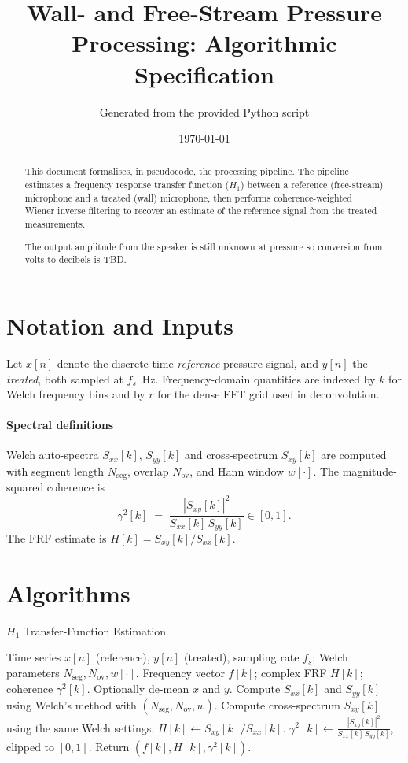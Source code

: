 \documentclass[a4paper,11pt]{article}
\title{Wall- and Free-Stream Pressure Processing: Algorithmic Specification}
\author{Generated from the provided Python script}
\date{\today}
\begin{document}
\maketitle

\begin{abstract}
This document formalises, in pseudocode, the processing pipeline. The pipeline estimates a frequency response  transfer function ($H_1$) between a reference (free-stream) microphone and a treated (wall) microphone, then performs coherence-weighted Wiener inverse filtering to recover an estimate of the reference signal from the treated measurements.

The output amplitude from the speaker is still unknown at pressure so conversion from volts to decibels is TBD.
\end{abstract}

\section{Notation and Inputs}
    Let $x[n]$ denote the discrete-time \emph{reference} pressure signal, and $y[n]$ the \emph{treated}, both sampled at $f_s$~Hz. Frequency-domain quantities are indexed by $k$ for Welch frequency bins and by $r$ for the dense FFT grid used in deconvolution.

    \paragraph{Spectral definitions}
    Welch auto-spectra $S_{xx}[k]$, $S_{yy}[k]$ and cross-spectrum $S_{xy}[k]$ are computed with segment length $N_{\mathrm{seg}}$, overlap $N_{\mathrm{ov}}$, and Hann window $w[\cdot]$. The magnitude-squared coherence is
    \begin{equation}
        \gamma^2[k] \;=\; \frac{|S_{xy}[k]|^2}{S_{xx}[k]\,S_{yy}[k]}\in[0,1].
    \end{equation}
    The FRF estimate is $H[k] = S_{xy}[k]/S_{xx}[k]$.

\section{Algorithms}

\begin{algorithm}
    \caption{$H_1$ Transfer-Function Estimation}
    \label{alg:h1}
    \begin{algorithmic}[1]
        \Require Time series $x[n]$ (reference), $y[n]$ (treated), sampling rate $f_s$; Welch parameters $N_{\mathrm{seg}}, N_{\mathrm{ov}}, w[\cdot]$.
        \Ensure Frequency vector $f[k]$; complex FRF $H[k]$; coherence $\gamma^2[k]$.
        \State Optionally de-mean $x$ and $y$.
        \State Compute $S_{xx}[k]$ and $S_{yy}[k]$ using Welch's method with $(N_{\mathrm{seg}}, N_{\mathrm{ov}}, w)$.
        \State Compute cross-spectrum $S_{xy}[k]$ using the same Welch settings. 
        \State $H[k] \gets S_{xy}[k]/S_{xx}[k]$.
        \State $\gamma^2[k] \gets \frac{|S_{xy}[k]|^2}{S_{xx}[k]\,S_{yy}[k]}$, clipped to $[0,1]$.
        \State Return $(f[k], H[k], \gamma^2[k])$.
    \end{algorithmic}
\end{algorithm}
\end{document}
